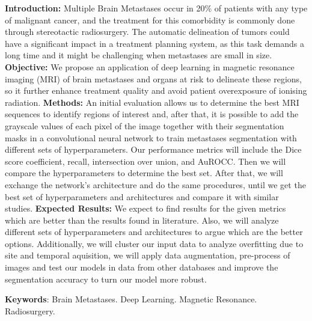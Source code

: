 
\begin{center}
\imprimirtitleenglish
\end{center}

\begin{resumo}[Abstract]
\textbf{Introduction:} Multiple Brain Metastases  occur in 20\% of patients with any type of malignant cancer, and the treatment for this comorbidity is commonly done through stereotactic radiosurgery. The automatic delineation of tumors could have a significant impact in a treatment planning system, as this task demands a long time and it might be challenging when metastases are small in size.
\textbf{Objective:} We propose an application of deep learning in magnetic resonance imaging (MRI) of brain metastases and organs at risk to delineate these regions, so it further enhance treatment quality and avoid patient overexposure of ionising radiation. 
\textbf{Methods:} An initial evaluation allows us to determine the best MRI sequences to identify regions of interest and, after that, it is possible to add the grayscale values of each pixel of the image together with their segmentation masks in a convolutional neural network to train metastases segmentation with different sets of hyperparameters. Our performance metrics will include the Dice score coefficient, recall, intersection over union, and AuROCC. Then we will compare the hyperparameters to determine the best set. After that, we will exchange the network's architecture and do the same procedures, until we get the best set of hyperparameters and architectures and compare it with similar studies. 
\textbf{Expected Results:} We expect to find results for the given metrics which are better than the results found in literature. Also, we will analyze different sets of hyperparameters and architectures to argue which are the better options. Additionally, we will cluster our input data to analyze overfitting due to site and temporal aquisition, we will apply data augmentation, pre-process of images and test our models in data from other databases and improve the segmentation accuracy to turn our model more robust.

	\textbf{Keywords}: Brain Metastases. Deep Learning. Magnetic Resonance. Radiosurgery.

\end{resumo}
